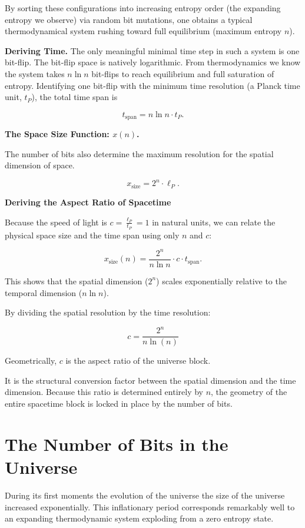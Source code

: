 By sorting these configurations into increasing entropy order (the expanding entropy we observe) 
via random bit mutations, one obtains a typical thermodynamical system rushing toward full equilibrium (maximum entropy $n$).

\textbf{Deriving Time.} 
The only meaningful minimal time step in such a system is one bit-flip. 
The bit-flip space is natively logarithmic. 
From thermodynamics we know the system takes $n \ln n$ bit-flips to reach equilibrium and full saturation of entropy. 
Identifying one bit-flip with the minimum time resolution (a Planck time unit, $t_P$), the total time span is

\[
t_{\text{span}} = n \ln n \cdot t_P.
\]

\textbf{The Space Size Function: $x(n)$.} 

The number of bits also determine the maximum resolution for the spatial dimension of space.

\[
x_{\text{size}} = 2^n \cdot \ell_P.
\]

\textbf{Deriving the Aspect Ratio of Spacetime} 

Because the speed of light is $c = \frac{\ell_P}{t_P} = 1$ in natural units, we can relate the physical space size and the time span using only $n$ and $c$:

\[
x_{\text{size}}(n) = \frac{2^n}{n \ln n} \cdot c \cdot t_{\text{span}}.
\]

This shows that the spatial dimension ($2^n$) scales exponentially relative to the temporal dimension ($n \ln n$).

By dividing the spatial resolution  by the time resolution:


\[
c = \frac{2^n}{n \ln(n)}
\]


Geometrically, $c$ is the aspect ratio of the universe block.

It is the structural conversion factor between the spatial dimension and the time dimension.
Because this ratio is determined entirely by $n$, the geometry of the entire spacetime
block is locked in place by the number of bits. 


\section*{The Number of Bits in the Universe}


During its first moments the evolution of the universe the size of the universe increased exponentially. 
This inflationary period corresponds remarkably well to an expanding thermodynamic system exploding
from a zero entropy state.

